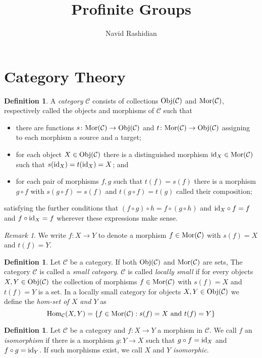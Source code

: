 \documentclass[12pt]{article}
\title{Profinite Groups}
\author{Navid Rashidian}
\date{}
\theoremstyle{definition}
\newtheorem{dfn}[thm]{Definition}
\theoremstyle{remark}
\newtheorem{rem}[thm]{Remark}
\newcommand{\catvar}[1]{\mathcal{#1}}
\newcommand{\CC}{\catvar{C}}
\newcommand{\Obj}[1]{\textup{Obj}(#1)}
\newcommand{\Mor}[1]{\textup{Mor}(#1)}
\begin{document}
    \maketitle

    \section{Category Theory}

    \begin{dfn}
        A \emph{category} $\mathcal{C}$ consists of collections $\Obj{\CC}$ and $\Mor{\CC}$, respectively called the objects and morphisms of $\CC$ such that
        \begin{itemize}
            \item there are functions $s\colon\Mor{\CC}\to\Obj{\CC}$ and $t\colon\Mor{\CC}\to\Obj{\CC}$  assigning to each morphism a source and a target;
            \item for each object $X\in\Obj{\CC}$ there is a distinguished morphism $\textup{id}_X\in\Mor{\CC}$ such that $s(\textup{id}_X)=t(\textup{id}_X)=X$; and
            \item for each pair of morphisms $f,g$ such that $t(f)=s(f)$ there is a morphism $g\circ f$ with $s(g\circ f)=s(f)$ and $t(g\circ f)=t(g)$ called their composition;
        \end{itemize}
        satisfying the further conditions that $(f\circ g)\circ h=f\circ(g\circ h)$ and $\textup{id}_X\circ f=f$ and $f\circ\textup{id}_X=f$ wherever these expressions make sense.
    \end{dfn}

    \begin{rem}
        We write $f\colon X\to Y$ to denote a morphism $f\in\Mor{\CC}$ with $s(f)=X$ and $t(f)=Y$.
    \end{rem}

    \begin{dfn}
        Let $\CC$ be a category. If both $\Obj{\CC}$ and $\Mor{\CC}$ are sets, The category $\CC$ is called a \emph{small category}. $\CC$ is called \emph{locally small} if for every objects $X,Y\in\Obj{\CC}$ the collection of morphisms $f\in\Mor{\CC}$ with $s(f)=X$ and $t(f)=Y$ is a set. In a locally small category for objects $X,Y\in\Obj{\CC}$ we define the \emph{hom-set of $X$ and $Y$} as
        $$
            \textup{Hom}_\CC(X,Y)=\{f\in\Mor{\CC}:s(f)=X\ \textup{and}\ t(f)=Y\}
        $$
    \end{dfn}

    \begin{dfn}
        Let $\CC$ be a category and $f\colon X\to Y$ a morphism in $\CC$. We call $f$ an \emph{isomorphism} if there is a morphism $g\colon Y\to X$ such that $g\circ f=\textup{id}_X$ and $f\circ g=\textup{id}_Y$. If such morphisms exist, we call $X$ and $Y$ \emph{isomorphic}.
    \end{dfn}
\end{document}
